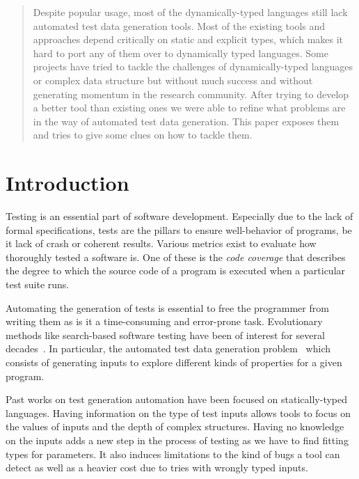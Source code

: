 \documentclass{llncs2e/llncs}
\begin{document}
\vfill

\begin{abstract}
Despite popular usage, most of the dynamically-typed languages still lack
automated test data generation tools. Most of the existing tools and approaches
depend critically on static and explicit types, which makes it hard to port any
of them over to dynamically typed languages. Some projects have tried to tackle
the challenges of dynamically-typed languages or complex data structure but
without much success and without generating momentum in the research community.
After trying to develop a better tool than existing ones we were able to refine
what problems are in the way of automated test data generation. This paper
exposes them and tries to give some clues on how to tackle them.
\end{abstract}
%
\newpage


\section{Introduction}
Testing is an essential part of software development. Especially due to the lack
of formal specifications, tests are the pillars to ensure well-behavior of
programs, be it lack of crash or coherent results. Various metrics exist to
evaluate how thoroughly tested a software is. One of these is the \textit{code
coverage} that describes the degree to which the source code of a program is
executed when a particular test suite runs.

Automating the generation of tests is essential to free the programmer from
writing them as is it a time-consuming and error-prone task. Evolutionary
methods like search-based software testing have been of interest for several
decades~\cite{miller1976automatic}. In particular, the automated test data
generation problem~\cite{korel1990automated} which consists of generating inputs
to explore different kinds of properties for a given program.

Past works on test generation automation have been focused on statically-typed
languages. Having information on the type of test inputs allows tools to focus
on the values of inputs and the depth of complex structures. Having no knowledge
on the inputs adds a new step in the process of testing as we have to find
fitting types for parameters. It also induces limitations to the kind of bugs a
tool can detect as well as a heavier cost due to tries with wrongly typed
inputs.
\end{document}
